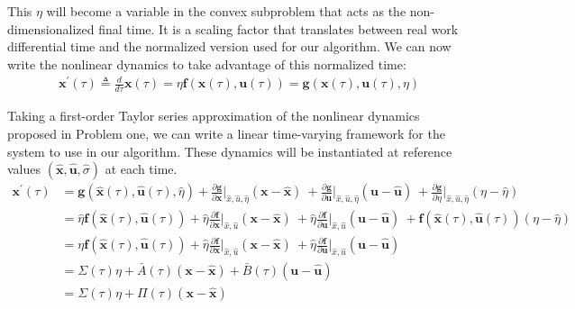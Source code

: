 This $\eta$ will become a variable in the convex subproblem that acts as the non-dimensionalized final time. It is a scaling factor that translates between real work differential time and the normalized version used for our algorithm. We can now write the nonlinear dynamics to take advantage of this normalized time:
\begin{align}
& \mathbf{x}^\prime(\tau) \triangleq \frac{d}{d\tau}\mathbf{x}(\tau) = \eta \mathbf{f}(\mathbf{x}(\tau), \mathbf{u}(\tau)) = \mathbf{g}(\mathbf{x}(\tau), \mathbf{u}(\tau), \eta)
\end{align}

Taking a first-order Taylor series approximation of the nonlinear dynamics proposed in Problem one, we can write a linear time-varying framework for the system to use in our algorithm. These dynamics will be instantiated at reference values $(\hat{\mathbf{x}}, \hat{\mathbf{u}}, \hat{\sigma})$ at each time. 
%
\begin{align}
\mathbf{x}^\prime(\tau) 
&= \mathbf{g}(\hat{\mathbf{x}}(\tau), \hat{\mathbf{u}}(\tau), \hat{\eta})
+ \frac{\partial \mathbf{g}}{\partial \mathbf{x}} \bigg\rvert_{\hat{x},\hat{u},\hat{\eta}} (\mathbf{x} - \hat{\mathbf{x}}) \ 
+ \frac{\partial \mathbf{g}}{\partial \mathbf{u}} \bigg\rvert_{\hat{x},\hat{u},\hat{\eta}} (\mathbf{u} - \hat{\mathbf{u}}) \ 
+ \frac{\partial \mathbf{g}}{\partial \eta} \bigg\rvert_{\hat{x},\hat{u},\hat{\eta}} (\eta - \hat{\eta}) \\
&= \hat{\eta} \mathbf{f}(\hat{\mathbf{x}}(\tau), \hat{\mathbf{u}}(\tau))
+ \hat{\eta} \frac{\partial \mathbf{f}}{\partial \mathbf{x}} \bigg\rvert_{\hat{x},\hat{u}} (\mathbf{x} - \hat{\mathbf{x}}) \
+ \hat{\eta} \frac{\partial \mathbf{f}}{\partial \mathbf{u}} \bigg\rvert_{\hat{x},\hat{u}} (\mathbf{u} - \hat{\mathbf{u}}) \
+ \mathbf{f}(\hat{\mathbf{x}}(\tau), \hat{\mathbf{u}}(\tau)) (\eta - \hat{\eta}) \\
&= {\eta} \mathbf{f}(\hat{\mathbf{x}}(\tau), \hat{\mathbf{u}}(\tau))
+ \hat{\eta} \frac{\partial \mathbf{f}}{\partial \mathbf{x}} \bigg\rvert_{\hat{x},\hat{u}} (\mathbf{x} - \hat{\mathbf{x}}) \
+ \hat{\eta} \frac{\partial \mathbf{f}}{\partial \mathbf{u}} \bigg\rvert_{\hat{x},\hat{u}} (\mathbf{u} - \hat{\mathbf{u}}) \\ 
& = \Sigma(\tau)\eta + \bar{A}(\tau) (\mathbf{x} - \hat{\mathbf{x}}) + \bar{B}(\tau)(\mathbf{u} - \hat{\mathbf{u}}) \\
& = \Sigma(\tau)\eta + \Pi(\tau) (\mathbf{x} - \hat{\mathbf{x}})
\end{align}

